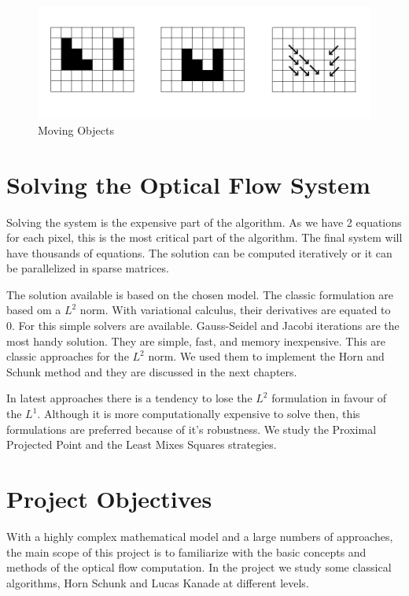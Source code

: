\documentclass[12pt,a4paper,twoside]{report}
\begin{document}
\begin{figure} \label{moreflow}
	\centering
	\includegraphics[width = 5in]{img/morefow} 
	\caption{Moving Objects}
\end{figure}

\section{Solving the Optical Flow System}

Solving the system is the expensive part of the algorithm. 
As we have 2 equations for each pixel, this is the most critical part of the algorithm. The final system will have thousands of equations. The solution can be computed iteratively or it can be parallelized in sparse matrices. 

The solution available is based on the chosen model. The classic formulation are based om a $L^2$ norm. With variational calculus, their derivatives are equated to 0. For this simple solvers are available. Gauss-Seidel and Jacobi iterations are the most handy solution. They are simple, fast, and memory inexpensive. This are classic approaches for the $L^2$ norm. We used them to implement the Horn and Schunk method and they are discussed in the next chapters.

In latest approaches there is a tendency to lose the $L^2$ formulation in favour of the $L^1$. Although it is more computationally expensive to solve then, this formulations are preferred because of it's robustness. We study the Proximal Projected Point and the Least Mixes Squares strategies.

\section{Project Objectives}

With a highly complex mathematical model and a large numbers of approaches, the main scope of this project is to familiarize with the basic concepts and methods of the optical flow computation. In the project we study some classical algorithms, Horn Schunk and Lucas Kanade at different levels.
\end{document}
